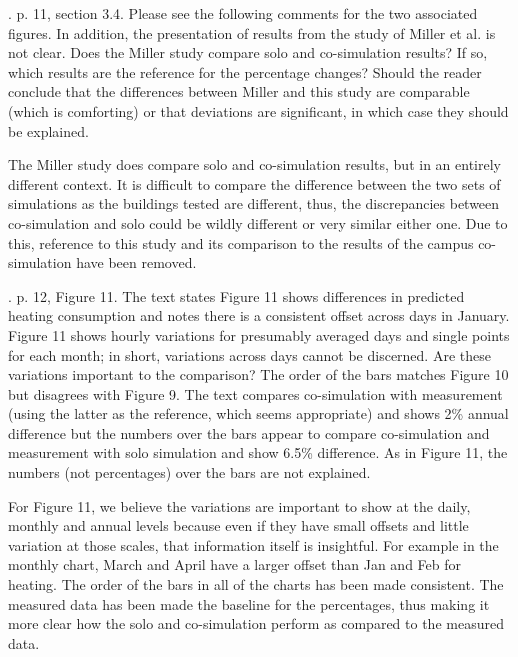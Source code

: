 \documentclass[answers,12pt]{exam}
\begin{document}
\begin{questions}
. p. 11, section 3.4.  Please see the following comments for the two associated figures.  In addition, the presentation of results from the study of Miller et al. is not clear.  Does the Miller study compare solo and co-simulation results?  If so, which results are the reference for the percentage changes? Should the reader conclude that the differences between Miller and this study are comparable (which is comforting) or that deviations are significant, in which case they should be explained. 
\begin{solution}
The Miller study does compare solo and co-simulation results, but in an entirely different context. It is difficult to compare the difference between the two sets of simulations as the buildings tested are different, thus, the discrepancies between co-simulation and solo could be wildly different or very similar either one. Due to this, reference to this study and its comparison to the results of the campus co-simulation have been removed.
\end{solution}

. p. 12, Figure 11.  The text states Figure 11 shows differences in predicted heating consumption and notes there is a consistent offset across days in January.  Figure 11 shows hourly variations for presumably averaged days and single points for each month; in short, variations across days cannot be discerned.  Are these variations important to the comparison?  The order of the bars matches Figure 10 but disagrees with Figure 9.  The text compares co-simulation with measurement (using the latter as the reference, which seems appropriate) and shows 2\% annual difference but the numbers over the bars appear to compare co-simulation and measurement with solo simulation and show 6.5\% difference.  As in Figure 11, the numbers (not percentages) over the bars are not explained. 
\begin{solution}
For Figure 11, we believe the variations are important to show at the daily, monthly and annual levels because even if they have small offsets and little variation at those scales, that information itself is insightful. For example in the monthly chart, March and April have a larger offset than Jan and Feb for heating. The order of the bars in all of the charts has been made consistent. The measured data has been made the baseline for the percentages, thus making it more clear how the solo and co-simulation perform as compared to the measured data.
\end{solution}


\end{questions}
\end{document}
